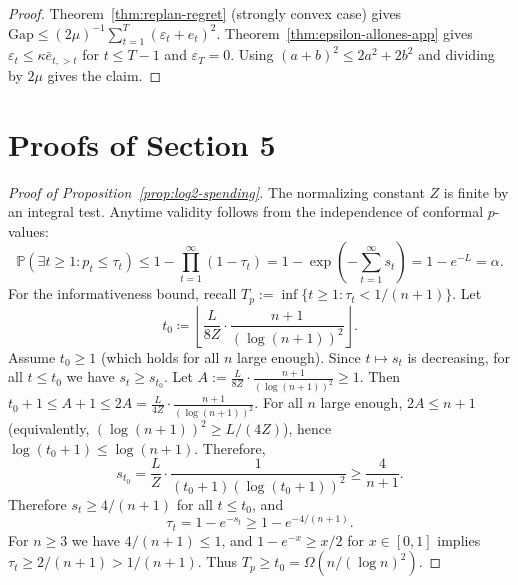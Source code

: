 \documentclass{uai2026} %
\newcommand{\1}{\mathbf{1}}
\newcommand{\prob}{\mathbb{P}}
\renewcommand{\epsilon}{\varepsilon}
\begin{document}
\begin{proof}
  Theorem~\ref{thm:replan-regret} (strongly convex case) gives
  $\mathrm{Gap}\le (2\mu)^{-1}\sum_{t=1}^{T}(\epsilon_t+e_t)^2$.
  Theorem~\ref{thm:epsilon-allones-app} gives $\epsilon_t \le \kappa \bar{e}_{t,>t}$ for $t \le T-1$ and $\epsilon_T=0$.
  Using $(a+b)^2\le 2a^2+2b^2$ and dividing by $2\mu$ gives the claim.
\end{proof}

\section{Proofs of Section 5}
\label{app:proofs_5}

\begin{proof}[Proof of Proposition~\ref{prop:log2-spending}]
  The normalizing constant $Z$ is finite by an integral test.
  Anytime validity follows from the independence of conformal $p$-values:
  \begin{equation*}
    \prob(\exists t \ge 1 \colon p_t \le \tau_t)
    \le 1 - \prod_{t=1}^{\infty} (1 - \tau_t)
    = 1 - \exp\left(-\sum_{t=1}^{\infty} s_t\right)
    = 1 - e^{-L}
    = \alpha.
  \end{equation*}
  For the informativeness bound, recall $T_p := \inf\{t \ge 1 : \tau_t < 1/(n{+}1)\}$.
  Let
  \begin{equation*}
    t_0 \coloneqq \left\lfloor \frac{L}{8Z}\cdot \frac{n{+}1}{(\log(n{+}1))^2} \right\rfloor.
  \end{equation*}
  Assume $t_0 \ge 1$ (which holds for all $n$ large enough).
  Since $t\mapsto s_t$ is decreasing, for all $t \le t_0$ we have $s_t \ge s_{t_0}$.
  Let $A := \frac{L}{8Z}\cdot \frac{n{+}1}{(\log(n{+}1))^2} \ge 1$.
  Then $t_0+1 \le A+1 \le 2A = \frac{L}{4Z}\cdot \frac{n{+}1}{(\log(n{+}1))^2}$.
  For all $n$ large enough, $2A \le n{+}1$ (equivalently, $(\log(n{+}1))^2 \ge L/(4Z)$), hence $\log(t_0{+}1)\le \log(n{+}1)$.
  Therefore,
  \begin{equation*}
    s_{t_0}
    = \frac{L}{Z}\cdot \frac{1}{(t_0{+}1)(\log(t_0{+}1))^2}
    \ge \frac{4}{n{+}1}.
  \end{equation*}
  Therefore $s_t \ge 4/(n{+}1)$ for all $t \le t_0$, and
  \begin{equation*}
    \tau_t = 1-e^{-s_t} \ge 1-e^{-4/(n{+}1)}.
  \end{equation*}
  For $n \ge 3$ we have $4/(n{+}1)\le 1$, and $1-e^{-x}\ge x/2$ for $x\in[0,1]$ implies $\tau_t \ge 2/(n{+}1) > 1/(n{+}1)$.
  Thus $T_p \ge t_0 = \Omega(n/(\log n)^2)$.
\end{proof}\par\medskip
\end{document}
